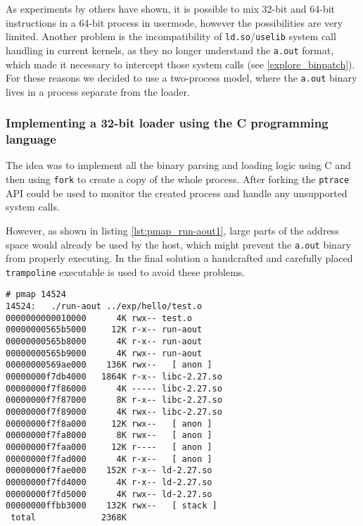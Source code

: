 \documentclass{article}
\begin{document}
As experiments by others have shown\cite{SOMix32And64BitInstructions}, it is possible to mix 32-bit and 64-bit instructions in a 64-bit process in usermode, however the possibilities are very limited. Another problem is the incompatibility of \texttt{ld.so}/\texttt{uselib} system call handling in current kernels, as they no longer understand the \texttt{a.out} format, which made it necessary to intercept those system calls (see \ref{explore_binpatch}). For these reasons we decided to use a two-process model, where the \texttt{a.out} binary lives in a process separate from the loader.

\subsubsection{Implementing a 32-bit loader using the C programming language}
\label{explore_loader_using_C}

The idea was to implement all the binary parsing and loading logic using C and then using \texttt{fork} to create a copy of the whole process. After forking the \texttt{ptrace} API could be used to monitor the created process and handle any unsupported system calls.

However, as shown in listing \ref{lst:pmap_run-aout1}, large parts of the address space would already be used by the host, which might prevent the \texttt{a.out} binary from properly executing. In the final solution a handcrafted and carefully placed \texttt{trampoline} executable is used to avoid these problems.

\begin{lstlisting}[caption={Output of \texttt{pmap} showing the memory mappings of an early prototype of \texttt{run-aout}}, label={lst:pmap_run-aout1}]
# pmap 14524
14524:   ./run-aout ../exp/hello/test.o
0000000000010000      4K rwx-- test.o
00000000565b5000     12K r-x-- run-aout
00000000565b8000      4K r-x-- run-aout
00000000565b9000      4K rwx-- run-aout
00000000569ae000    136K rwx--   [ anon ]
00000000f7db4000   1864K r-x-- libc-2.27.so
00000000f7f86000      4K ----- libc-2.27.so
00000000f7f87000      8K r-x-- libc-2.27.so
00000000f7f89000      4K rwx-- libc-2.27.so
00000000f7f8a000     12K rwx--   [ anon ]
00000000f7fa8000      8K rwx--   [ anon ]
00000000f7faa000     12K r----   [ anon ]
00000000f7fad000      4K r-x--   [ anon ]
00000000f7fae000    152K r-x-- ld-2.27.so
00000000f7fd4000      4K r-x-- ld-2.27.so
00000000f7fd5000      4K rwx-- ld-2.27.so
00000000ffbb3000    132K rwx--   [ stack ]
 total             2368K
\end{lstlisting}
\end{document}
